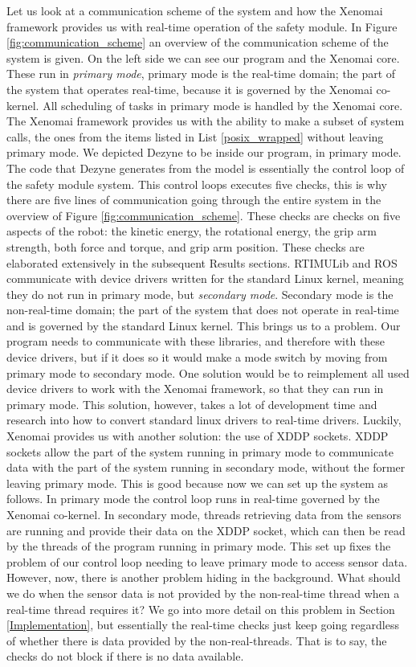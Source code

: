 \documentclass[12pt]{scrreprt}
\begin{document}
Let us look at a communication scheme of the system and how the Xenomai framework provides us with real-time operation of the safety module. In Figure \ref{fig:communication_scheme} an overview of the communication scheme of the system is given. On the left side we can see our program and the Xenomai core. These run in \textit{primary mode}, primary mode is the real-time domain; the part of the system that operates real-time, because it is governed by the Xenomai co-kernel. All scheduling of tasks in primary mode is handled by the Xenomai core. The Xenomai framework provides us with the ability to make a subset of system calls, the ones from the items listed in List \ref{posix_wrapped} without leaving primary mode. We depicted Dezyne to be inside our program, in primary mode. The code that Dezyne generates from the model is essentially the control loop of the safety module system. This control loops executes five checks, this is why there are five lines of communication going through the entire system in the overview of Figure \ref{fig:communication_scheme}. These checks are checks on five aspects of the robot: the kinetic energy, the rotational energy, the grip arm strength, both force and torque, and grip arm position. These checks are elaborated extensively in the subsequent Results sections. RTIMULib and ROS communicate with device drivers written for the standard Linux kernel, meaning they do not run in primary mode, but \textit{secondary mode}. Secondary mode is the non-real-time domain; the part of the system that does not operate in real-time and is governed by the standard Linux kernel. This brings us to a problem. Our program needs to communicate with these libraries, and therefore with these device drivers, but if it does so it would make a mode switch by moving from primary mode to secondary mode. One solution would be to reimplement all used device drivers to work with the Xenomai framework, so that they can run in primary mode. This solution, however, takes a lot of development time and research into how to convert standard linux drivers to real-time drivers. Luckily, Xenomai provides us with another solution: the use of XDDP sockets. XDDP sockets allow the part of the system running in primary mode to communicate data with the part of the system running in secondary mode, without the former leaving primary mode. This is good because now we can set up the system as follows. In primary mode the control loop runs in real-time governed by the Xenomai co-kernel. In secondary mode, threads retrieving data from the sensors are running and provide their data on the XDDP socket, which can then be read by the threads of the program running in primary mode. This set up fixes the problem of our control loop needing to leave primary mode to access sensor data. However, now, there is another problem hiding in the background. What should we do when the sensor data is not provided by the non-real-time thread when a real-time thread requires it? We go into more detail on this problem in Section \ref{Implementation}, but essentially the real-time checks just keep going regardless of whether there is data provided by the non-real-threads. That is to say, the checks do not block if there is no data available.
\end{document}
